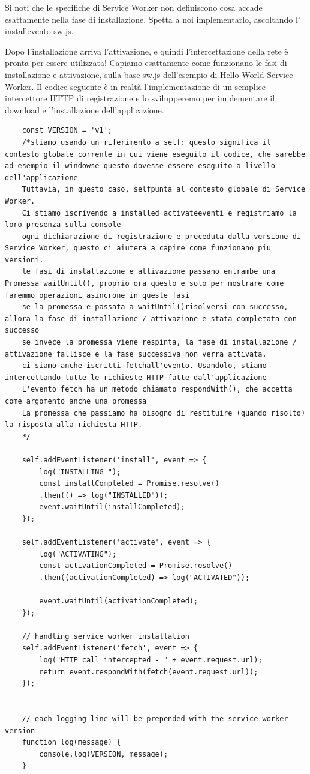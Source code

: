 \documentclass[italian]{article}
\begin{document}
Si noti che le specifiche di Service Worker non definiscono cosa accade esattamente nella fase di installazione. Spetta a noi implementarlo, ascoltando l' installevento sw.js.

Dopo l'installazione arriva l'attivazione, e quindi l'intercettazione della rete è pronta per essere utilizzata! Capiamo esattamente come funzionano le fasi di installazione e attivazione, sulla base sw.js dell'esempio di Hello World Service Worker. Il codice seguente è in realtà l'implementazione di un semplice intercettore HTTP di registrazione e lo svilupperemo per implementare il download e l'installazione dell'applicazione.
\begin{lstlisting}
	const VERSION = 'v1';
	/*stiamo usando un riferimento a self: questo significa il contesto globale corrente in cui viene eseguito il codice, che sarebbe ad esempio il windowse questo dovesse essere eseguito a livello dell'applicazione
	Tuttavia, in questo caso, selfpunta al contesto globale di Service Worker.
	Ci stiamo iscrivendo a installed activateeventi e registriamo la loro presenza sulla console
	ogni dichiarazione di registrazione e preceduta dalla versione di Service Worker, questo ci aiutera a capire come funzionano piu versioni.
	le fasi di installazione e attivazione passano entrambe una Promessa waitUntil(), proprio ora questo e solo per mostrare come faremmo operazioni asincrone in queste fasi
	se la promessa e passata a waitUntil()risolversi con successo, allora la fase di installazione / attivazione e stata completata con successo
	se invece la promessa viene respinta, la fase di installazione / attivazione fallisce e la fase successiva non verra attivata.
	ci siamo anche iscritti fetchall'evento. Usandolo, stiamo intercettando tutte le richieste HTTP fatte dall'applicazione
	L'evento fetch ha un metodo chiamato respondWith(), che accetta come argomento anche una promessa
	La promessa che passiamo ha bisogno di restituire (quando risolto) la risposta alla richiesta HTTP.
	*/
	
	self.addEventListener('install', event => {
		log("INSTALLING ");
		const installCompleted = Promise.resolve()
		.then(() => log("INSTALLED"));
		event.waitUntil(installCompleted);
	});
	
	self.addEventListener('activate', event => {
		log("ACTIVATING");
		const activationCompleted = Promise.resolve()
		.then((activationCompleted) => log("ACTIVATED"));
		
		event.waitUntil(activationCompleted);
	});
	
	// handling service worker installation
	self.addEventListener('fetch', event => {
		log("HTTP call intercepted - " + event.request.url);
		return event.respondWith(fetch(event.request.url));
	});
	
	
	// each logging line will be prepended with the service worker version
	function log(message) {
		console.log(VERSION, message);
	}
\end{lstlisting}
\end{document}
